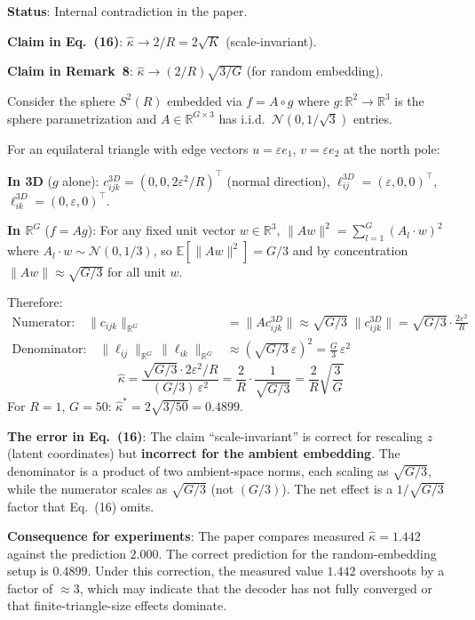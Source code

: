 \documentclass{article}
\newcommand{\RR}{\mathbb{R}}
\begin{document}
\textbf{Status}: Internal contradiction in the paper.

\medskip
\textbf{Claim in Eq.~(16)}: $\hat{\kappa} \to 2/R = 2\sqrt{K}$ (scale-invariant).

\textbf{Claim in Remark~8}: $\hat{\kappa} \to (2/R)\sqrt{3/G}$ (for random embedding).

\begin{proofbox}
Consider the sphere $S^2(R)$ embedded via $f = A \circ g$ where
$g: \RR^2 \to \RR^3$ is the sphere parametrization and
$A \in \RR^{G \times 3}$ has i.i.d.\ $\mathcal{N}(0, 1/\sqrt{3})$ entries.

For an equilateral triangle with edge vectors $u = \varepsilon e_1$,
$v = \varepsilon e_2$ at the north pole:

\textbf{In 3D} ($g$ alone):
$c_{ijk}^{3D} = (0, 0, 2\varepsilon^2/R)^\top$ (normal direction),
$\ell_{ij}^{3D} = (\varepsilon, 0, 0)^\top$,
$\ell_{ik}^{3D} = (0, \varepsilon, 0)^\top$.

\textbf{In $\RR^G$} ($f = Ag$): For any fixed unit vector $w \in \RR^3$,
$\|Aw\|^2 = \sum_{l=1}^G (A_l \cdot w)^2$ where $A_l \cdot w \sim
\mathcal{N}(0, 1/3)$, so $\mathbb{E}[\|Aw\|^2] = G/3$ and by concentration
$\|Aw\| \approx \sqrt{G/3}$ for all unit $w$.

Therefore:
\begin{align*}
    \text{Numerator:}\quad \|c_{ijk}\|_{\RR^G}
      &= \|A c_{ijk}^{3D}\| \approx \sqrt{G/3}\;\|c_{ijk}^{3D}\|
      = \sqrt{G/3}\cdot\frac{2\varepsilon^2}{R} \\
    \text{Denominator:}\quad \|\ell_{ij}\|_{\RR^G}\,\|\ell_{ik}\|_{\RR^G}
      &\approx \left(\sqrt{G/3}\,\varepsilon\right)^2
      = \frac{G}{3}\,\varepsilon^2
\end{align*}
\begin{equation}
    \hat{\kappa}
    = \frac{\sqrt{G/3}\cdot 2\varepsilon^2/R}{(G/3)\,\varepsilon^2}
    = \frac{2}{R}\cdot\frac{1}{\sqrt{G/3}}
    = \frac{2}{R}\sqrt{\frac{3}{G}}
\end{equation}
For $R = 1$, $G = 50$: $\hat{\kappa}^* = 2\sqrt{3/50} = 0.4899$.

\medskip
\textbf{The error in Eq.~(16)}: The claim ``scale-invariant'' is correct for
rescaling $z$ (latent coordinates) but \textbf{incorrect for the ambient
embedding}. The denominator is a product of two ambient-space norms, each
scaling as $\sqrt{G/3}$, while the numerator scales as $\sqrt{G/3}$ (not
$(G/3)$). The net effect is a $1/\sqrt{G/3}$ factor that Eq.~(16) omits.

\medskip
\textbf{Consequence for experiments}: The paper compares measured
$\hat{\kappa} = 1.442$ against the prediction $2.000$. The correct prediction
for the random-embedding setup is $0.4899$. Under this correction, the
measured value $1.442$ overshoots by a factor of $\approx 3$, which may
indicate that the decoder has not fully converged or that finite-triangle-size
effects dominate.
\end{proofbox}
\end{document}
